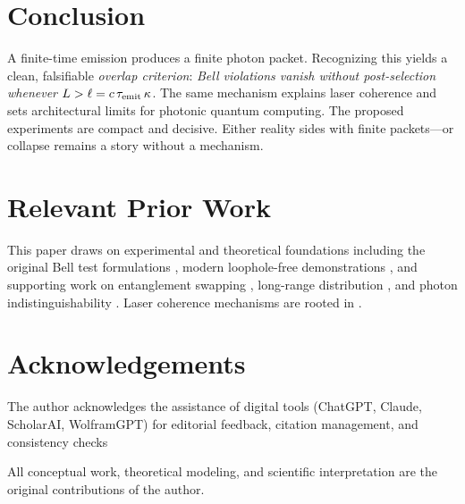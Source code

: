 \documentclass[reprint,aps,prl,nofootinbib,superscriptaddress]{revtex4-2}
\begin{document}
\section{Conclusion}
A finite-time emission produces a finite photon packet. Recognizing this yields a clean, falsifiable \emph{overlap criterion}: \emph{Bell violations vanish without post-selection whenever $L>\ell = c\,\tau_{\rm emit}\,\kappa$}. The same mechanism explains laser coherence and sets architectural limits for photonic quantum computing. The proposed experiments are compact and decisive. Either reality sides with finite packets---or collapse remains a story without a mechanism.

\section*{Relevant Prior Work}
This paper draws on experimental and theoretical foundations including the original Bell test formulations \cite{CHSH1969,Eberhard1993}, modern loophole-free demonstrations \cite{Giustina2015,Shalm2015,Hensen2015}, and supporting work on entanglement swapping \cite{Vedovato2018}, long-range distribution \cite{Yin2017}, and photon indistinguishability \cite{HongMandel1987}. Laser coherence mechanisms are rooted in \cite{Siegman1986,TownesSchawlow1955}.

\section*{Acknowledgements}
\begin{acknowledgments}
The author acknowledges the assistance of digital tools (ChatGPT, Claude, ScholarAI, WolframGPT) for editorial feedback, citation management, and consistency checks

All conceptual work, theoretical modeling, and scientific interpretation are the original contributions of the author.
\end{acknowledgments}




\end{document}
